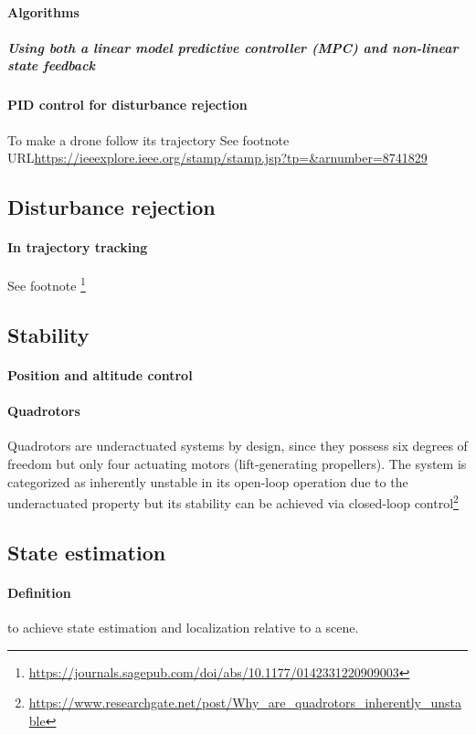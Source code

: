 \documentclass{article}
\begin{document}
			\paragraph{Algorithms}
				\subparagraph{Using both a linear model predictive controller (MPC) and non-linear state feedback}
			\paragraph{PID control for disturbance rejection}
				To make a drone follow its trajectory
				See footnote URL\url{https://ieeexplore.ieee.org/stamp/stamp.jsp?tp=&arnumber=8741829}
		\subsection{Disturbance rejection}
			\paragraph{In trajectory tracking}
			See footnote \footnote{\url{https://journals.sagepub.com/doi/abs/10.1177/0142331220909003}}
		\subsection{Stability}
			\paragraph{Position and altitude control}
			\cite{nascimento-2019-position-and-attitude-control-of-multi-rotor-aerial-vehicles-a-survey}
			\paragraph{Quadrotors} Quadrotors are underactuated systems by design, since they possess six degrees of freedom but only four actuating motors (lift-generating propellers). The system is categorized as inherently unstable in its open-loop operation due to the underactuated property but its stability can be achieved via closed-loop control\footnote{\url{https://www.researchgate.net/post/Why_are_quadrotors_inherently_unstable}}
		\subsection{State estimation}
			\paragraph{Definition} to achieve state estimation and localization relative to a scene.
\end{document}
